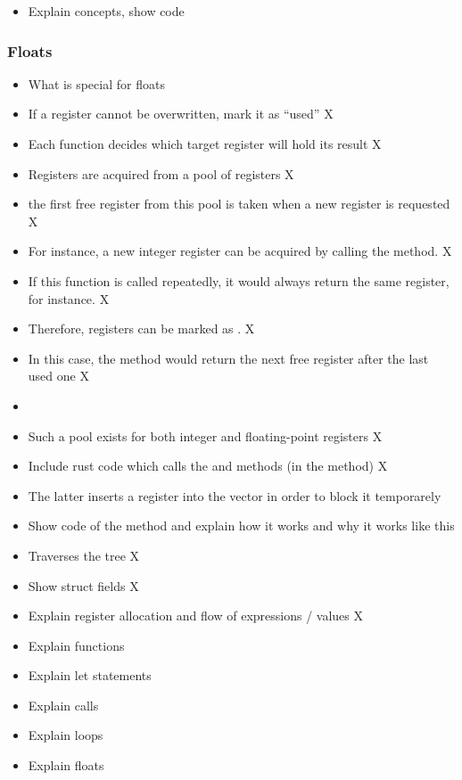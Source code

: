 \begin{itemize}
    \item Explain concepts, show code
\end{itemize}

\subsubsection{Floats}

\begin{itemize}
    \item What is special for floats
\end{itemize}

\begin{itemize}
	\item If a register cannot be overwritten, mark it as \enquote{used} X
	\item Each function decides which target register will hold its result X
	\item Registers are acquired from a pool of registers X
	\item the first free register from this pool is taken when a new register is requested X
	\item For instance, a new integer register can be acquired by calling the  method. X
	\item If this function is called repeatedly, it would always return the same register,  for instance. X
	\item Therefore, registers can be marked as . X
	\item In this case, the method would return the next free register after the last used one X
	\item {}
	\item Such a pool exists for both integer and floating-point registers X
	\item Include rust code which calls the  and  methods (in the  method) X
	\item The latter inserts a register into the  vector in order to block it temporarely
	\item Show code of the  method and explain how it works and why it works like this
\end{itemize}

\begin{itemize}
	\item Traverses the tree X
	\item Show struct fields X
	\item Explain register allocation and flow of expressions / values X
	\item Explain functions
	\item Explain let statements
	\item Explain calls
	\item Explain loops
	\item Explain floats
\end{itemize}

